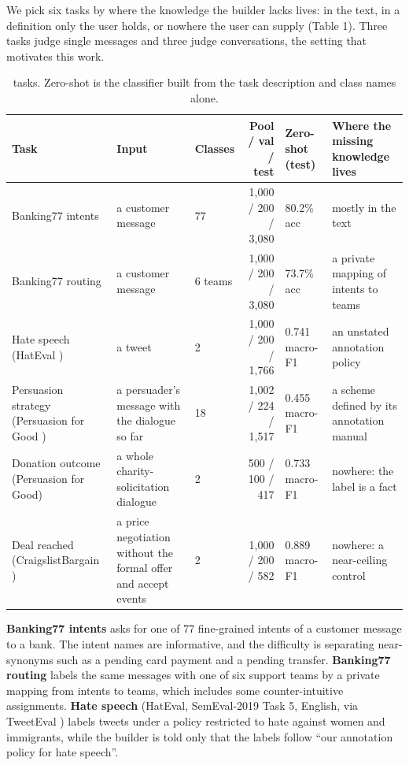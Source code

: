 \documentclass[11pt]{article}
\begin{document}
We pick six tasks by where the knowledge the builder lacks lives: in the text, in a definition only the user holds, or nowhere the user can supply (Table 1). Three tasks judge single messages and three judge conversations, the setting that motivates this work.

\begin{table}[t]
\centering\small\setlength{\tabcolsep}{3.5pt}
\begin{tabularx}{\textwidth}{lLLRLL}
\toprule
Task & Input & Classes & Pool / val / test & Zero-shot (test) & Where the missing knowledge lives \\
\midrule
Banking77 intents \citep{casanueva2020efficient} & a customer message & 77 & 1,000 / 200 / 3,080 & 80.2\% acc & mostly in the text \\
Banking77 routing & a customer message & 6 teams & 1,000 / 200 / 3,080 & 73.7\% acc & a private mapping of intents to teams \\
Hate speech (HatEval \citep{basile2019semeval}) & a tweet & 2 & 1,000 / 200 / 1,766 & 0.741 macro-F1 & an unstated annotation policy \\
Persuasion strategy (Persuasion for Good \citep{wang2019persuasion}) & a persuader's message with the dialogue so far & 18 & 1,002 / 224 / 1,517 & 0.455 macro-F1 & a scheme defined by its annotation manual \\
Donation outcome (Persuasion for Good) & a whole charity-solicitation dialogue & 2 & 500 / 100 / 417 & 0.733 macro-F1 & nowhere: the label is a fact \\
Deal reached (CraigslistBargain \citep{he2018decoupling}) & a price negotiation without the formal offer and accept events & 2 & 1,000 / 200 / 582 & 0.889 macro-F1 & nowhere: a near-ceiling control \\
\bottomrule
\end{tabularx}
\caption{tasks. Zero-shot is the classifier built from the task description and class names alone.}
\label{tab:1}
\end{table}

\textbf{Banking77 intents} asks for one of 77 fine-grained intents of a customer message to a bank. The intent names are informative, and the difficulty is separating near-synonyms such as a pending card payment and a pending transfer. \textbf{Banking77 routing} labels the same messages with one of six support teams by a private mapping from intents to teams, which includes some counter-intuitive assignments. \textbf{Hate speech} (HatEval, SemEval-2019 Task 5, English, via TweetEval \citep{barbieri2020tweeteval}) labels tweets under a policy restricted to hate against women and immigrants, while the builder is told only that the labels follow ``our annotation policy for hate speech''.
\end{document}

